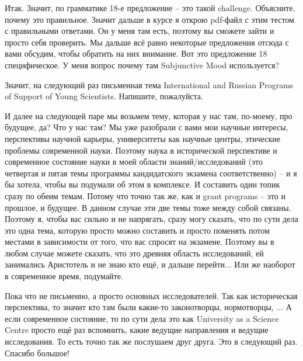 \documentclass[main.tex]{subfiles}
\begin{document}
Итак.
Значит, по грамматике 18-е предложение -- это такой challenge.
Объясните, почему это правильное.
Значит дальше в курсе я открою pdf-файл с этим тестом с правильными ответами.
Он у меня там есть, поэтому вы сможете зайти и просто себя проверить.
Мы дальше всё равно некоторые предложения отсюда с вами обсудим, чтобы обратить на них внимание.
Вот это предложение 18 специфическое.
У меня вопрос почему там Subjunctive Mood используется?

Значит, на следующий раз письменная тема International and Russian Programs of Support of Young Scientists.
Напишите, пожалуйста.

И далее на следующей паре мы возьмем тему, которая у нас там, по-моему, про будущее, да?
Что у нас там?
Мы уже разобрали с вами мои научные интересы, перспективы научной карьеры, университеты как научные центры, этические проблемы современной науки.
Поэтому наука в исторической перспективе и современное состояние науки в моей области знаний/исследований (это четвертая и пятая темы программы кандидатского экзамена соответственно) -- и я бы хотела, чтобы вы подумали об этом в комплексе.
И составить один топик сразу по обеим темам.
Потому что точно так же, как и grant programs -- это и прошлое, и будущее.
В данном случае эти две темы тоже между собой связаны.
Поэтому я, чтобы вас сильно и не напрягать, сразу могу сказать, что по сути дела это одна тема, которую просто можно составить и просто поменять потом местами в зависимости от того, что вас спросят на экзамене.
Поэтому вы в любом случае можете сказать, что это древняя область исследований, ей занимались Аристотель и не знаю кто ещё, и дальше перейти...
Или же наоборот в современное время, подумайте.

Пока что не письменно, а просто основных исследователей.
Так как историческая перспектива, то значит кто там были какие-то законотворцы, нормотворцы, ...
А если современное состояние, то по сути дела это как University as a Science Centre просто ещё раз вспомнить, какие ведущие направления и ведущие исследования.
То есть точно так же послушаем друг друга.
Это в следующий раз.
Спасибо большое!
\end{document}
